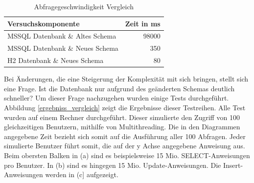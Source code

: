 \begin{table}[htbp]
\centering
\begin{tabular} {l | r}
Versuchskomponente & Zeit in ms  \\ \hline
MSSQL Datenbank \& Altes Schema & 98000 \\
MSSQL Datenbank \& Neues Schema & 350 \\
H2 Datenbank \& Neues Schema & 80 \\
\end{tabular}
\caption{Abfragegeschwindigkeit Vergleich}
\label{tb:vergleichAbfragegeschwindigkeit}
\end{table}

Bei Änderungen, die eine Steigerung der Komplexität mit sich bringen, stellt sich eine Frage. Ist die Datenbank nur aufgrund des geänderten Schemas deutlich schneller? Um dieser Frage nachzugehen wurden einige Tests durchgeführt. Abbildung \ref{ergebniss_vergleich} zeigt die Ergebnisse dieser Testreihen. Alle Test wurden auf einem Rechner durchgeführt. Dieser simulierte den Zugriff von 100 gleichzeitigen Benutzern, mithilfe von Multithreading. Die in den Diagrammen angegebene Zeit bezieht sich somit auf die Ausführung aller 100 Abfragen. Jeder simulierte Benutzer führt somit, die auf der y Achse angegebene Anweisung aus. Beim obersten Balken in (a) sind es beispielsweise 15 Mio. SELECT-Anweisungen pro Benutzer. In (b) sind es hingegen 15 Mio. Update-Anweisungen. Die Insert-Anweisungen werden in (c] aufgezeigt.    


